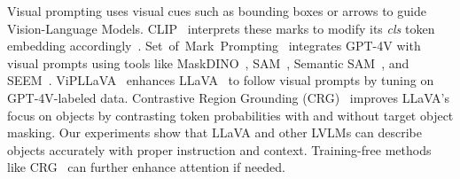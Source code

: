  Visual prompting uses visual cues such as bounding boxes or arrows to guide Vision-Language Models. CLIP~\cite{radford2021clip} interprets these marks to modify its \textit{cls} token embedding accordingly~\cite{shtedritski2023does}. Set~of~Mark~Prompting~\cite{yang2023set} integrates GPT-4V with visual prompts using tools like MaskDINO~\cite{li2022mask}, SAM~\cite{kirillov2023segment}, Semantic SAM~\cite{li2023semantic}, and SEEM~\cite{zou2024seem}. ViPLLaVA~\cite{cai2024vip} enhances LLaVA~\cite{liu2024visual} to follow visual prompts by tuning on GPT-4V-labeled data. Contrastive Region Grounding (CRG)~\cite{Wan2024CRG} improves LLaVA’s focus on objects by contrasting token probabilities with and without target object masking. Our experiments show that LLaVA and other LVLMs can describe objects accurately with proper instruction and context. Training-free methods like CRG~\cite{Wan2024CRG} can further enhance attention if needed.
